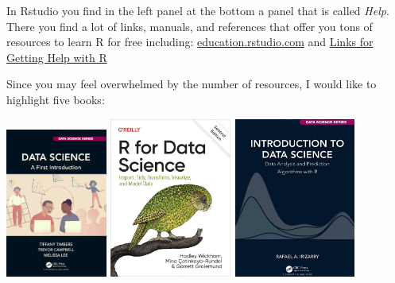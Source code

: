 \documentclass[
  12pt,
  oneside]{book}
\begin{document}
In Rstudio you find in the left panel at the bottom a panel that is called \emph{Help}. There you find a lot of links, manuals, and references that offer you tons of resources to learn R for free including:
\href{https://education.rstudio.com/}{education.rstudio.com}
and \href{https://support.rstudio.com/hc/en-us/articles/200552336-Getting-Help-with-R}{Links for Getting Help with R}

Since you may feel overwhelmed by the number of resources, I would like to highlight five books:

\includegraphics[width=0.25\textwidth,height=\textheight]{fig/ds-a-first-intro-cover.jpg}
\includegraphics[width=0.3\textwidth,height=\textheight]{fig/r4ds-cover.jpg}
\includegraphics[width=0.3\textwidth,height=\textheight]{fig/irizarrybook.png}
\end{document}
